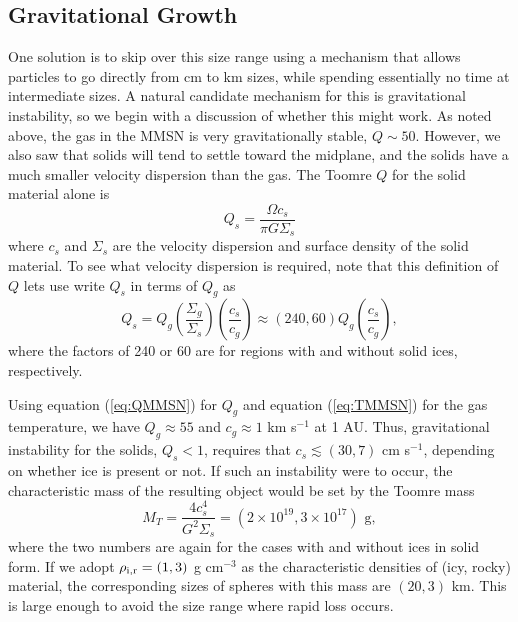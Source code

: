 \subsection{Gravitational Growth}

One solution is to skip over this size range using a mechanism that allows particles to go directly from cm to km sizes, while spending essentially no time at intermediate sizes. A natural candidate mechanism for this is gravitational instability, so we begin with a discussion of whether this might work. As noted above, the gas in the MMSN is very gravitationally stable, $Q \sim 50$. However, we also saw that solids will tend to settle toward the midplane, and the solids have a much smaller velocity dispersion than the gas. The Toomre $Q$ for the solid material alone is
\begin{equation}
Q_s = \frac{\Omega c_s}{\pi G \Sigma_s}
\end{equation}
where $c_s$ and $\Sigma_s$ are the velocity dispersion and surface density of the solid material. To see what velocity dispersion is required, note that this definition of $Q$ lets use write $Q_s$ in terms of $Q_g$ as
\begin{equation}
Q_s = Q_g \left(\frac{\Sigma_g}{\Sigma_s}\right) \left(\frac{c_s}{c_g}\right) \approx(240, 60) Q_g \left(\frac{c_s}{c_g}\right),
\end{equation}
where the factors of 240 or 60 are for regions with and without solid ices, respectively.

Using equation (\ref{eq:QMMSN}) for $Q_g$ and equation (\ref{eq:TMMSN}) for the gas temperature, we have $Q_g\approx 55$ and $c_g\approx 1$ km s$^{-1}$ at 1 AU. Thus, gravitational instability for the solids, $Q_s<1$, requires that $c_s \lesssim (30, 7)$ cm s$^{-1}$, depending on whether ice is present or not. If such an instability were to occur, the characteristic mass of the resulting object would be set by the Toomre mass
\begin{equation}
M_T = \frac{4 c_s^4}{G^2 \Sigma_s} = (2\times 10^{19}, 3\times 10^{17})\mbox{ g},
\end{equation}
where the two numbers are again for the cases with and without ices in solid form. If we adopt $\rho_{\rm i,r} = (1,3)$ g cm$^{-3}$ as the characteristic densities of (icy, rocky) material, the corresponding sizes of spheres with this mass are $(20, 3)$ km. This is large enough to avoid the size range where rapid loss occurs.

